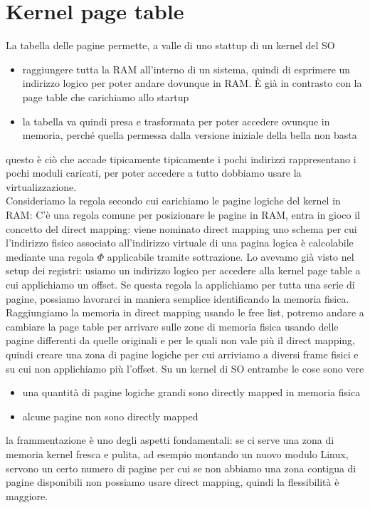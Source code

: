 \documentclass[12pt, oneside]{extbook}
\begin{document}
\section{Kernel page table}
La tabella delle pagine permette, a valle di uno stattup di un kernel del SO 
\begin{itemize}
\item raggiungere tutta la RAM all'interno di un sistema, quindi di esprimere un indirizzo logico per poter andare dovunque in RAM. È già in contrasto con la page table che carichiamo allo startup
\item la tabella va quindi presa e trasformata per poter accedere ovunque in memoria, perché quella permessa dalla versione iniziale della bella non basta
\end{itemize}
questo è ciò che accade tipicamente
tipicamente i pochi indirizzi rappresentano i pochi moduli caricati, per poter accedere a tutto dobbiamo usare la virtualizzazione.\\ Consideriamo la regola secondo cui carichiamo le pagine logiche del kernel in RAM: 
C'è una regola comune per posizionare le pagine in RAM, entra in gioco il concetto del direct mapping: viene nominato direct mapping uno schema per cui l'indirizzo fisico associato all'indirizzo virtuale di una pagina logica è calcolabile mediante una regola $\Phi$ applicabile tramite sottrazione. Lo avevamo già visto nel setup dei registri: usiamo un indirizzo logico per accedere alla kernel page table a cui applichiamo un offset. Se questa regola la applichiamo per tutta una serie di pagine, possiamo lavorarci in maniera semplice identificando la memoria fisica. Raggiungiamo la memoria in direct mapping usando le free list, potremo andare a cambiare la page table per arrivare sulle zone di memoria fisica usando delle pagine differenti da quelle originali e per le quali non vale più il direct mapping, quindi creare una zona di pagine logiche per cui arriviamo a diversi frame fisici e su cui non applichiamo più l'offset. Su un kernel di SO entrambe le cose sono vere
\begin{itemize}
\item una quantità di pagine logiche grandi sono directly mapped in memoria fisica
\item alcune pagine non sono directly mapped
\end{itemize}
la frammentazione è uno degli aspetti fondamentali: se ci serve una zona di memoria kernel fresca e pulita, ad esempio montando un nuovo modulo Linux, servono un certo numero di pagine per cui se non abbiamo una zona contigua di pagine disponibili non possiamo usare direct mapping, quindi la flessibilità è maggiore. 
\end{document}
